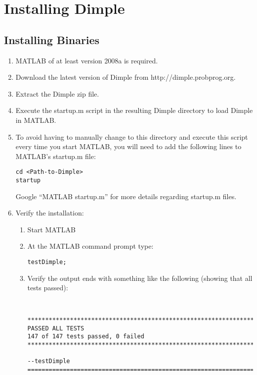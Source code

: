 \section{Installing Dimple}


\subsection{Installing Binaries}

\ifmatlab

\begin{enumerate}
\item MATLAB of at least version 2008a is required. 
\item Download the latest version of Dimple from http://dimple.probprog.org.
\item Extract the Dimple zip file.
\item Execute the startup.m script in the resulting Dimple directory to 
load Dimple in MATLAB.
\item To avoid having to manually change to this directory and execute 
this script every time you start MATLAB, you will need to add the following lines to MATLAB's startup.m file:
\begin{lstlisting}
cd <Path-to-Dimple>
startup
\end{lstlisting}
Google ``MATLAB startup.m'' for more details regarding startup.m files.
\item Verify the installation:
\begin{enumerate}
\item Start MATLAB
\item  At the MATLAB command prompt type:
\begin{lstlisting} 
testDimple;
\end{lstlisting}
\item Verify the output ends with something like the following (showing that all tests passed): \\
\begin{minipage}{\textwidth}
\begin{lstlisting} 


**********************************************************************
PASSED ALL TESTS
147 of 147 tests passed, 0 failed
**********************************************************************

--testDimple
======================================================================
\end{lstlisting}
\end{minipage}

\end{enumerate}
\end{enumerate}


